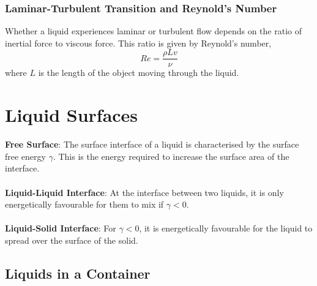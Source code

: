 \documentclass{book}
\begin{document}
\subsubsection{Laminar-Turbulent Transition and Reynold's Number}
Whether a liquid experiences laminar or turbulent flow depends on the ratio of inertial force to viscous force. This ratio is given by Reynold's number,
\begin{equation}
	\boxed{Re = \frac{\rho L v}{\nu}}
\end{equation}
where $L$ is the length of the object moving through the liquid.
\section{Liquid Surfaces}
\textbf{Free Surface}: The surface interface of a liquid is characterised by the surface free energy $\gamma$. This is the energy required to increase the surface area of the interface.\\\\
\textbf{Liquid-Liquid Interface}: At the interface between two liquids, it is only energetically favourable for them to mix if $\gamma <0$.\\\\
\textbf{Liquid-Solid Interface}: For $\gamma < 0$, it is energetically favourable for the liquid to spread over the surface of the solid.
\subsection{Liquids in a Container}
\end{document}

